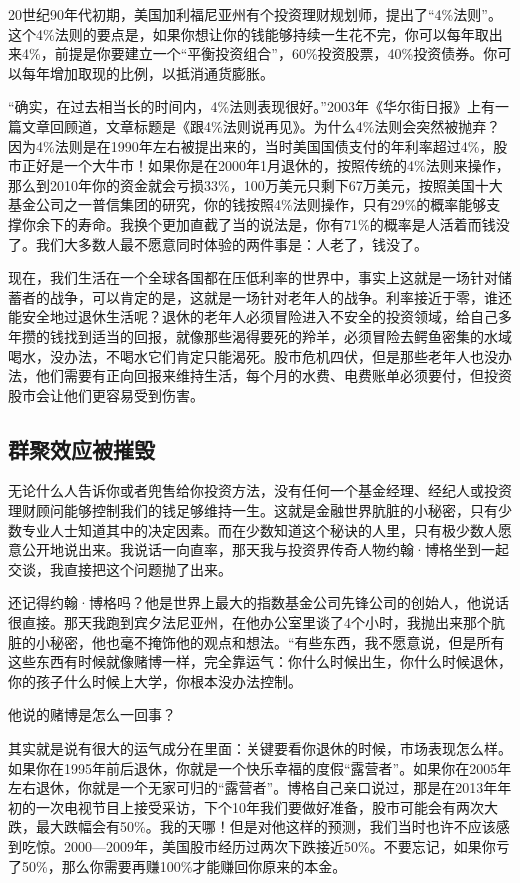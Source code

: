 20世纪90年代初期，美国加利福尼亚州有个投资理财规划师，提出了“4\%法则”。这个4\%法则的要点是，如果你想让你的钱能够持续一生花不完，你可以每年取出来4\%，前提是你要建立一个“平衡投资组合”，60\%投资股票，40\%投资债券。你可以每年增加取现的比例，以抵消通货膨胀。

“确实，在过去相当长的时间内，4\%法则表现很好。”2003年《华尔街日报》上有一篇文章回顾道，文章标题是《跟4\%法则说再见》。为什么4\%法则会突然被抛弃？因为4\%法则是在1990年左右被提出来的，当时美国国债支付的年利率超过4\%，股市正好是一个大牛市！如果你是在2000年1月退休的，按照传统的4\%法则来操作，那么到2010年你的资金就会亏损33\%，100万美元只剩下67万美元，按照美国十大基金公司之一普信集团的研究，你的钱按照4\%法则操作，只有29\%的概率能够支撑你余下的寿命。我换个更加直截了当的说法是，你有71\%的概率是人活着而钱没了。我们大多数人最不愿意同时体验的两件事是：人老了，钱没了。

现在，我们生活在一个全球各国都在压低利率的世界中，事实上这就是一场针对储蓄者的战争，可以肯定的是，这就是一场针对老年人的战争。利率接近于零，谁还能安全地过退休生活呢？退休的老年人必须冒险进入不安全的投资领域，给自己多年攒的钱找到适当的回报，就像那些渴得要死的羚羊，必须冒险去鳄鱼密集的水域喝水，没办法，不喝水它们肯定只能渴死。股市危机四伏，但是那些老年人也没办法，他们需要有正向回报来维持生活，每个月的水费、电费账单必须要付，但投资股市会让他们更容易受到伤害。

\subsection{群聚效应被摧毁}

无论什么人告诉你或者兜售给你投资方法，没有任何一个基金经理、经纪人或投资理财顾问能够控制我们的钱足够维持一生。这就是金融世界肮脏的小秘密，只有少数专业人士知道其中的决定因素。而在少数知道这个秘诀的人里，只有极少数人愿意公开地说出来。我说话一向直率，那天我与投资界传奇人物约翰·博格坐到一起交谈，我直接把这个问题抛了出来。

还记得约翰·博格吗？他是世界上最大的指数基金公司先锋公司的创始人，他说话很直接。那天我跑到宾夕法尼亚州，在他办公室里谈了4个小时，我抛出来那个肮脏的小秘密，他也毫不掩饰他的观点和想法。“有些东西，我不愿意说，但是所有这些东西有时候就像赌博一样，完全靠运气：你什么时候出生，你什么时候退休，你的孩子什么时候上大学，你根本没办法控制。

他说的赌博是怎么一回事？

其实就是说有很大的运气成分在里面：关键要看你退休的时候，市场表现怎么样。如果你在1995年前后退休，你就是一个快乐幸福的度假“露营者”。如果你在2005年左右退休，你就是一个无家可归的“露营者”。博格自己亲口说过，那是在2013年年初的一次电视节目上接受采访，下个10年我们要做好准备，股市可能会有两次大跌，最大跌幅会有50\%。我的天哪！但是对他这样的预测，我们当时也许不应该感到吃惊。2000—2009年，美国股市经历过两次下跌接近50\%。不要忘记，如果你亏了50\%，那么你需要再赚100\%才能赚回你原来的本金。


